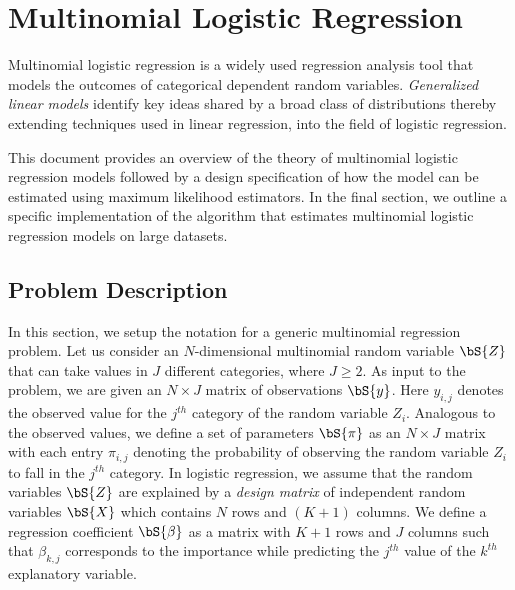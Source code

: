 \section{Multinomial Logistic Regression}\label{sec:multi_intro}
Multinomial logistic regression is a widely used regression analysis tool that models the outcomes of categorical dependent random variables. {\it Generalized linear models} identify key ideas shared by a broad class of distributions thereby extending techniques used in linear regression, into the field of logistic regression. 

This document provides an overview of the theory of multinomial logistic regression models followed by a design specification of how the model can be estimated using maximum likelihood estimators. In the final section, we outline a specific implementation of the algorithm that estimates multinomial logistic regression models on large datasets.

\subsection{Problem Description}\label{sec:multi_problem}
In this section, we setup the notation for a generic multinomial regression problem. Let us consider an $N$-dimensional multinomial random variable $\bS{Z}$ that can take values in $J$ different categories, where $J \geq 2$. As input to the problem, we are given an $N\times J$ matrix of observations $\bS{y}$. Here $y_{i,j}$ denotes the observed value for the $j^{th}$ category of the random variable $Z_i$.  Analogous to the observed values, we define a set of parameters $\bS{\pi}$  as an $N\times J$ matrix with each entry $\pi_{i,j}$ denoting the probability of observing the random variable $Z_i$ to fall in the $j^{th}$ category. In logistic regression, we assume that the random variables $\bS{Z}$ are explained by a {\it design matrix} of independent random variables $\bS{X}$ which contains $N$ rows and $(K+1)$ columns. We define a regression coefficient $\bS{\beta}$ as a matrix with $K+1$ rows and $J$ columns such that $\beta_{k,j}$ corresponds to the importance while predicting the $j^{th}$ value of the $k^{th}$ explanatory variable.
 
